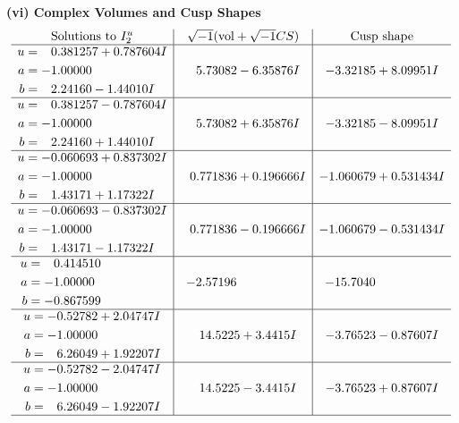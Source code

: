 \documentclass[1p]{elsarticle_modified}
\theoremstyle{definition}
\newcommand{\I}{\sqrt{-1}}
\begin{document}
\newpage\flushleft \textbf{(vi) Complex Volumes and Cusp Shapes}
$$\begin{array}{c|c|c}  
\text{Solutions to }I^u_{2}& \I (\text{vol} + \sqrt{-1}CS) & \text{Cusp shape}\\
 \hline 
\begin{aligned}
u &= \phantom{-}0.381257 + 0.787604 I \\
a &= -1.00000\phantom{ +0.000000I} \\
b &= \phantom{-}2.24160 - 1.44010 I\end{aligned}
 & \phantom{-}5.73082 - 6.35876 I & -3.32185 + 8.09951 I \\ \hline\begin{aligned}
u &= \phantom{-}0.381257 - 0.787604 I \\
a &= -1.00000\phantom{ +0.000000I} \\
b &= \phantom{-}2.24160 + 1.44010 I\end{aligned}
 & \phantom{-}5.73082 + 6.35876 I & -3.32185 - 8.09951 I \\ \hline\begin{aligned}
u &= -0.060693 + 0.837302 I \\
a &= -1.00000\phantom{ +0.000000I} \\
b &= \phantom{-}1.43171 + 1.17322 I\end{aligned}
 & \phantom{-}0.771836 + 0.196666 I & -1.060679 + 0.531434 I \\ \hline\begin{aligned}
u &= -0.060693 - 0.837302 I \\
a &= -1.00000\phantom{ +0.000000I} \\
b &= \phantom{-}1.43171 - 1.17322 I\end{aligned}
 & \phantom{-}0.771836 - 0.196666 I & -1.060679 - 0.531434 I \\ \hline\begin{aligned}
u &= \phantom{-}0.414510\phantom{ +0.000000I} \\
a &= -1.00000\phantom{ +0.000000I} \\
b &= -0.867599\phantom{ +0.000000I}\end{aligned}
 & -2.57196\phantom{ +0.000000I} & -15.7040\phantom{ +0.000000I} \\ \hline\begin{aligned}
u &= -0.52782 + 2.04747 I \\
a &= -1.00000\phantom{ +0.000000I} \\
b &= \phantom{-}6.26049 + 1.92207 I\end{aligned}
 & \phantom{-}14.5225 + 3.4415 I & -3.76523 - 0.87607 I \\ \hline\begin{aligned}
u &= -0.52782 - 2.04747 I \\
a &= -1.00000\phantom{ +0.000000I} \\
b &= \phantom{-}6.26049 - 1.92207 I\end{aligned}
 & \phantom{-}14.5225 - 3.4415 I & -3.76523 + 0.87607 I\\
 \hline 
 \end{array}$$\newpage\newpage\renewcommand{\arraystretch}{1}
\end{document}
